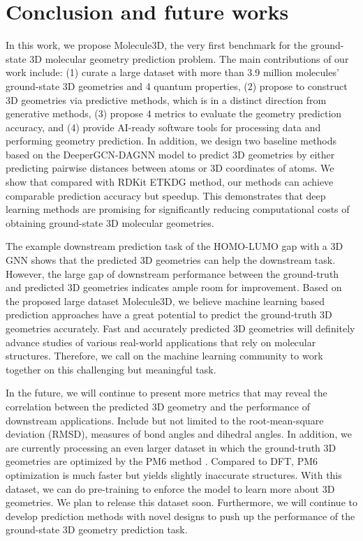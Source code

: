 \documentclass{article}
\begin{document}
\section{Conclusion and future works}

In this work, we propose Molecule3D, the very first benchmark for the ground-state 3D molecular geometry prediction problem. The main contributions of our work include: (1) curate a large dataset with more than 3.9 million molecules' ground-state 3D geometries and 4 quantum properties, (2) propose to construct 3D geometries via predictive methods, which is in a distinct direction from generative methods, (3) propose 4 metrics to evaluate the geometry prediction accuracy, and (4) provide AI-ready software tools for processing data and performing geometry prediction. In addition, we design two baseline methods based on the DeeperGCN-DAGNN \cite{liu2021fast} model to predict 3D geometries by either predicting pairwise distances between atoms or 3D coordinates of atoms. We show that compared with RDKit ETKDG \cite{riniker2015better} method, our methods can achieve comparable prediction accuracy but  speedup. This demonstrates that deep learning methods are promising for significantly reducing computational costs of obtaining ground-state 3D molecular geometries. 

The example downstream prediction task of the HOMO-LUMO gap with a 3D GNN shows that the predicted 3D geometries can help the downstream task. However, the large gap of downstream performance between the ground-truth and predicted 3D geometries indicates ample room for improvement. Based on the proposed large dataset Molecule3D, we believe machine learning based prediction approaches have a great potential to predict the ground-truth 3D geometries accurately. Fast and accurately predicted 3D geometries will definitely advance studies of various real-world applications that rely on molecular structures. Therefore, we call on the machine learning community to work together on this challenging but meaningful task. 




In the future, we will continue to present more metrics that may reveal the correlation between the predicted 3D geometry and the performance of downstream applications. Include but not limited to the root-mean-square deviation (RMSD), measures of bond angles and dihedral angles. In addition, we are currently processing an even larger dataset in which the ground-truth 3D geometries are optimized by the PM6 method \cite{nakata2020pubchemqc}. Compared to DFT, PM6 optimization is much faster but yields slightly inaccurate structures. With this dataset, we can do pre-training to enforce the model to learn more about 3D geometries. We plan to release this dataset soon. Furthermore, we will continue to develop prediction methods with novel designs to push up the performance of the ground-state 3D geometry prediction task. 
\end{document}
